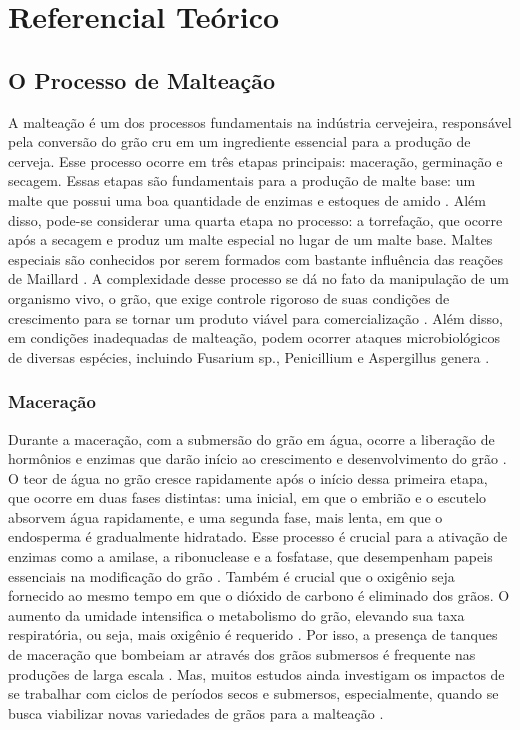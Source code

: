 \chapter[Referencial Teórico]{Referencial Teórico}

\section{O Processo de Malteação}

A malteação é um dos processos fundamentais na indústria cervejeira, responsável pela conversão do 
grão cru em um ingrediente essencial para a produção de cerveja. Esse processo ocorre em três etapas 
principais: maceração, germinação e secagem. Essas etapas são fundamentais para a produção de malte 
base: um malte que possui uma boa quantidade de enzimas e estoques de amido \cite{BRIGGS2004,CENCI2021}. 
Além disso, pode-se considerar uma quarta etapa no processo: a torrefação, que ocorre após a secagem e 
produz um malte especial no lugar de um malte base. Maltes especiais são conhecidos por serem formados 
com bastante influência das reações de Maillard \cite{COGHE2004}. A complexidade desse processo se 
dá no fato da manipulação de um organismo vivo, o grão, que exige controle rigoroso de suas condições de 
crescimento para se tornar um produto viável para comercialização \cite{MALLETT2022}. Além disso, em condições 
inadequadas de malteação, podem ocorrer ataques microbiológicos de diversas espécies, 
incluindo Fusarium sp., Penicillium e Aspergillus genera \cite{LUARASI2016}.

\subsection{Maceração}

Durante a maceração, com a submersão do grão em água, ocorre a liberação de hormônios e enzimas que darão 
início ao crescimento e desenvolvimento do grão \cite{LEWIS2012}. O teor de água no grão cresce rapidamente 
após o início dessa primeira etapa, que ocorre em duas fases distintas: uma inicial, em que o embrião e o escutelo 
absorvem água rapidamente, e uma segunda fase, mais lenta, em que o endosperma é gradualmente hidratado. 
Esse processo é crucial para a ativação de enzimas como a amilase, a ribonuclease e a fosfatase, que 
desempenham papeis essenciais na modificação do grão \cite{REYNOLDS1966}. Também é crucial que o 
oxigênio seja fornecido ao mesmo tempo em que o dióxido de carbono é eliminado dos grãos. O aumento da umidade 
intensifica o metabolismo do grão, elevando sua taxa respiratória, ou seja, mais oxigênio é requerido \cite{KUNZE1996}. 
Por isso, a presença de tanques de maceração que bombeiam ar através dos grãos submersos é frequente nas produções 
de larga escala \cite{CENCI2021}. Mas, muitos estudos ainda investigam os impactos de se trabalhar com ciclos 
de períodos secos e submersos, especialmente, quando se busca viabilizar novas variedades 
de grãos para a malteação \cite{MAYER2014,TURNER2019}.

